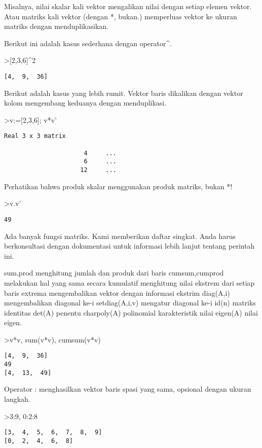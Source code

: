 \documentclass[
]{book}
\begin{document}
Misalnya, nilai skalar kali vektor mengalikan nilai dengan setiap elemen vektor. Atau matriks kali vektor (dengan *, bukan.) memperluas vektor ke ukuran matriks dengan menduplikasikan.

Berikut ini adalah kasus sederhana dengan operator\^{}.

\textgreater{[}2,3,6{]}\^{}2

\begin{verbatim}
[4,  9,  36]
\end{verbatim}

Berikut adalah kasus yang lebih rumit. Vektor baris dikalikan dengan vektor kolom mengembang keduanya dengan menduplikasi.

\textgreater v:={[}2,3,6{]}; v*v'

\begin{verbatim}
Real 3 x 3 matrix

                      4     ...
                      6     ...
                     12     ...
\end{verbatim}

Perhatikan bahwa produk skalar menggunakan produk matriks, bukan *!

\textgreater v.v'

\begin{verbatim}
49
\end{verbatim}

Ada banyak fungsi matriks. Kami memberikan daftar singkat. Anda harus berkonsultasi dengan dokumentasi untuk informasi lebih lanjut tentang perintah ini.

sum,prod menghitung jumlah dan produk dari baris cumsum,cumprod melakukan hal yang sama secara kumulatif menghitung nilai ekstrem dari setiap baris extrema mengembalikan vektor dengan informasi ekstrim diag(A,i) mengembalikan diagonal ke-i setdiag(A,i,v) mengatur diagonal ke-i id(n) matriks identitas det(A) penentu charpoly(A) polinomial karakteristik nilai eigen(A) nilai eigen.

\textgreater v*v, sum(v*v), cumsum(v*v)

\begin{verbatim}
[4,  9,  36]
49
[4,  13,  49]
\end{verbatim}

Operator : menghasilkan vektor baris spasi yang sama, opsional dengan ukuran langkah.

\textgreater3:9, 0:2:8

\begin{verbatim}
[3,  4,  5,  6,  7,  8,  9]
[0,  2,  4,  6,  8]
\end{verbatim}
\end{document}
